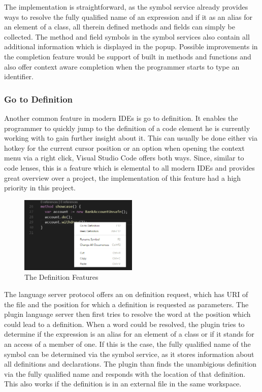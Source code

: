The implementation is straightforward, as the symbol service already provides ways to resolve the fully qualified name of an expression and if it as an alias for an element of a class, all therein defined methods and fields can simply be collected. The method and field symbols in the symbol services also contain all additional information which is displayed in the popup. Possible improvements in the completion feature would be support of built in methods and functions and also offer context aware completion when the programmer starts to type an identifier. 

\subsubsection{Go to Definition} \label{gotodefinition}
Another common feature in modern IDEs is go to definition. It enables the programmer to quickly jump to the definition of a code element he is currently working with to gain further insight about it. This can usually be done either via hotkey for the current cursor position or an option when opening the context menu via a right click, Visual Studio Code offers both ways.\newline
Since, similar to code lenses, this is a feature which is elemental to all modern IDEs and provides great overview over a project, the implementation of this feature had a high priority in this project. \newline
 \begin{figure}[H]
	\centering
	\includegraphics[width=0.5\textwidth]{img/goToDefinition}
	\caption{The Definition Features}
	\label{fig:gotodefinition}
\end{figure}
The language server protocol offers an on definition request, which has URI of the file and the position for which a definition is requested as parameters. The plugin language server then first tries to resolve the word at the position which could lead to a definition. When a word could be resolved, the plugin tries to determine if the expression is an alias for an element of a class or if it stands for an access of a member of one. If this is the case, the fully qualified name of the symbol can be determined via the symbol service, as it stores information about all definitions and declarations. The plugin than finds the unambigious definition via the fully qualified name and responds with the location of that definition. This also works if the definition is in an external file in the same workspace. \newline
